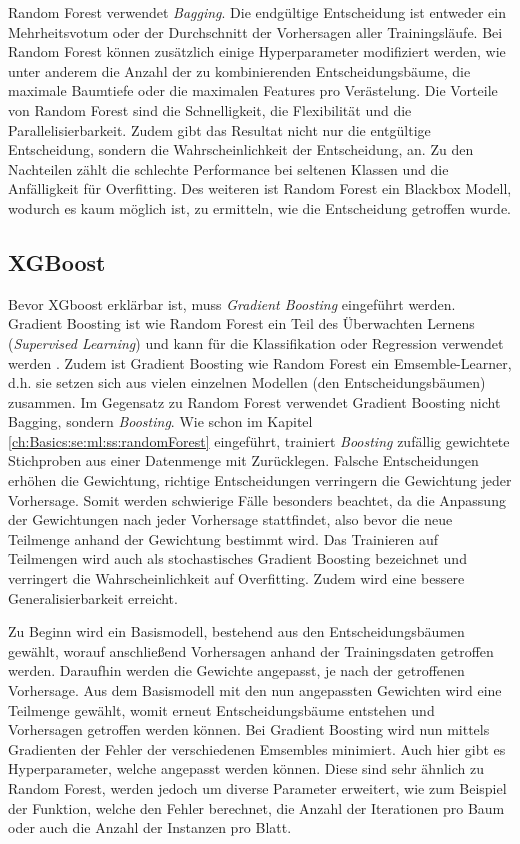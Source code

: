 Random Forest verwendet \textit{Bagging}. 
Die endgültige Entscheidung ist entweder ein Mehrheitsvotum oder der Durchschnitt der Vorhersagen aller Trainingsläufe.
Bei Random Forest können zusätzlich einige Hyperparameter modifiziert werden, wie unter anderem die Anzahl der zu kombinierenden Entscheidungsbäume, die maximale Baumtiefe oder die maximalen Features pro Verästelung. 
Die Vorteile von Random Forest sind die Schnelligkeit, die Flexibilität und die Parallelisierbarkeit.
Zudem gibt das Resultat nicht nur die entgültige Entscheidung, sondern die Wahrscheinlichkeit der Entscheidung, an.
Zu den Nachteilen zählt die schlechte Performance bei seltenen Klassen und die Anfälligkeit für Overfitting.
Des weiteren ist Random Forest ein Blackbox Modell, wodurch es kaum möglich ist, zu ermitteln, wie die Entscheidung getroffen wurde.

\subsection{XGBoost}
\label{ch:Basics:se:ml:ss:xgboost}
Bevor XGboost erklärbar ist, muss \textit{Gradient Boosting} eingeführt werden.
Gradient Boosting ist wie Random Forest ein Teil des Überwachten Lernens (\textit{Supervised Learning}) und kann für die Klassifikation oder Regression verwendet werden \cite{friedmannStochasticGradientBoosting1999}. 
Zudem ist Gradient Boosting wie Random Forest ein Emsemble-Learner, d.h. sie setzen sich aus vielen einzelnen Modellen (den Entscheidungsbäumen) zusammen.
Im Gegensatz zu Random Forest verwendet Gradient Boosting nicht Bagging, sondern \textit{Boosting}.
Wie schon im Kapitel \ref{ch:Basics:se:ml:ss:randomForest} eingeführt, trainiert \textit{Boosting} zufällig gewichtete Stichproben aus einer Datenmenge mit Zurücklegen. 
Falsche Entscheidungen erhöhen die Gewichtung, richtige Entscheidungen verringern die Gewichtung jeder Vorhersage. 
Somit werden schwierige Fälle besonders beachtet, da die Anpassung der Gewichtungen nach jeder Vorhersage stattfindet, also bevor die neue Teilmenge anhand der Gewichtung bestimmt wird.
Das Trainieren auf Teilmengen wird auch als stochastisches Gradient Boosting bezeichnet und verringert die Wahrscheinlichkeit auf Overfitting.
Zudem wird eine bessere Generalisierbarkeit erreicht.

Zu Beginn wird ein Basismodell, bestehend aus den Entscheidungsbäumen gewählt, worauf anschließend Vorhersagen anhand der Trainingsdaten getroffen werden. 
Daraufhin werden die Gewichte angepasst, je nach der getroffenen Vorhersage. 
Aus dem Basismodell mit den nun angepassten Gewichten wird eine Teilmenge gewählt, womit erneut Entscheidungsbäume entstehen und Vorhersagen getroffen werden können.
Bei Gradient Boosting wird nun mittels Gradienten der Fehler der verschiedenen Emsembles minimiert.
Auch hier gibt es Hyperparameter, welche angepasst werden können. Diese sind sehr ähnlich zu Random Forest, werden jedoch um diverse Parameter erweitert, wie zum Beispiel der Funktion, welche den Fehler berechnet, die Anzahl der Iterationen pro Baum oder auch die Anzahl der Instanzen pro Blatt.

